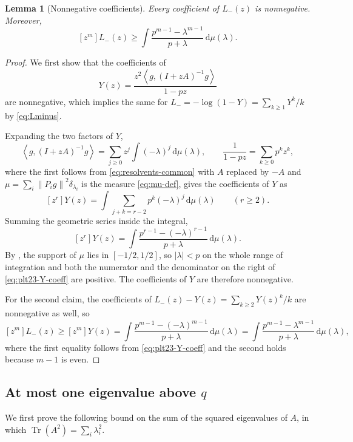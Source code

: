 \documentclass[11pt]{article}
\newtheorem{lemma}[theorem]{Lemma}
\numberwithin{equation}{section}
\newcommand{\ip}[2]{\left\langle #1,#2\right\rangle}
\newcommand{\norm}[1]{\left\lVert #1\right\rVert}
\newcommand{\Tr}{\operatorname{Tr}}
\newcommand{\dd}{\,\mathrm d}
\begin{document}
\begin{lemma}[Nonnegative coefficients]\label{lem:plt23-one-sided-identity}
  Every coefficient of $L_-(z)$ is nonnegative.
  Moreover,
  \begin{equation}\label{eq:plt23-Lminus-linear-lower}
    [z^m]L_-(z)\ge\int\frac{p^{m-1}-\lambda^{m-1}}{p+\lambda}\dd\mu(\lambda).
  \end{equation}
\end{lemma}

\begin{proof}
  We first show that the coefficients of
  \[
    Y(z)=\frac{z^2\ip g{(I+zA)^{-1}g}}{1-pz}
  \]
  are nonnegative, which implies the same for $L_-=-\log(1-Y)=\sum_{k\ge1}Y^k/k$ by \eqref{eq:Lminus}.

  Expanding the two factors of $Y$,
  \[
    \ip g{(I+zA)^{-1}g}=\sum_{j\ge0}z^j\int(-\lambda)^j\dd\mu(\lambda),
    \qquad
    \frac{1}{1-pz}=\sum_{k\ge0}p^kz^k,
  \]
  where the first follows from \eqref{eq:resolvents-common} with $A$ replaced by $-A$ and $\mu=\sum_i\norm{P_ig}^2\delta_{\lambda_i}$ is the measure \eqref{eq:mu-def}, gives the coefficients of $Y$ as
  \[
    [z^r]Y(z)
    =\int\sum_{j+k=r-2}p^k(-\lambda)^j\dd\mu(\lambda)
    \qquad(r\ge2).
  \]
  Summing the geometric series inside the integral,
  \begin{equation}\label{eq:plt23-Y-coeff}
    [z^r]Y(z)
    =\int\frac{p^{r-1}-(-\lambda)^{r-1}}{p+\lambda}\dd\mu(\lambda).
  \end{equation}
  By , the support of $\mu$ lies in $[-1/2,1/2]$, so $|\lambda|<p$ on the whole range of integration and both the numerator and the denominator on the right of \eqref{eq:plt23-Y-coeff} are positive.
  The coefficients of $Y$ are therefore nonnegative.

  For the second claim, the coefficients of $L_-(z)-Y(z)=\sum_{k\ge2}Y(z)^k/k$ are nonnegative as well, so
  \[
    [z^m]L_-(z)\ge[z^m]Y(z)
    =\int\frac{p^{m-1}-(-\lambda)^{m-1}}{p+\lambda}\dd\mu(\lambda)
    =\int\frac{p^{m-1}-\lambda^{m-1}}{p+\lambda}\dd\mu(\lambda),
  \]
  where the first equality follows from \eqref{eq:plt23-Y-coeff} and the second holds because $m-1$ is even.
\end{proof}


\subsection{At most one eigenvalue above \texorpdfstring{$q$}{q}}

We first prove the following bound on the sum of the squared eigenvalues of $A$, in which $\Tr(A^2)=\sum_i\lambda_i^2$.
\end{document}
